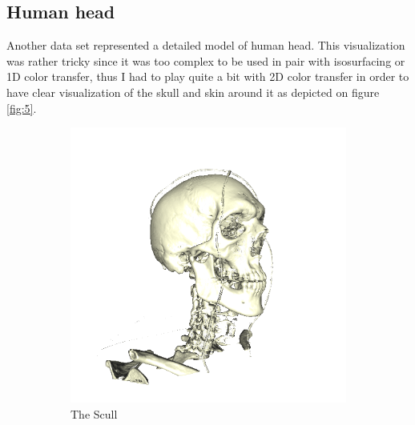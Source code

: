 \documentclass{article}
\begin{document}
\subsection{Human head}
Another data set represented a detailed model of human head. This visualization was rather tricky since it was too complex to be used in pair with isosurfacing or 1D color transfer, thus I had to play quite a bit with 2D color transfer in order to have clear visualization of the skull and skin around it as depicted on figure \ref{fig:5}.
\begin{figure}
	\centering
	\begin{subfigure}[h]{0.45\textwidth}
		\includegraphics[width=\textwidth]{skeleton.png}
		\caption{The Scull}
		\label{fig:skeleton}
	\end{subfigure}
	\begin{subfigure}[h]{0.45\textwidth}

\end{subfigure}
\end{figure}
\end{document}
